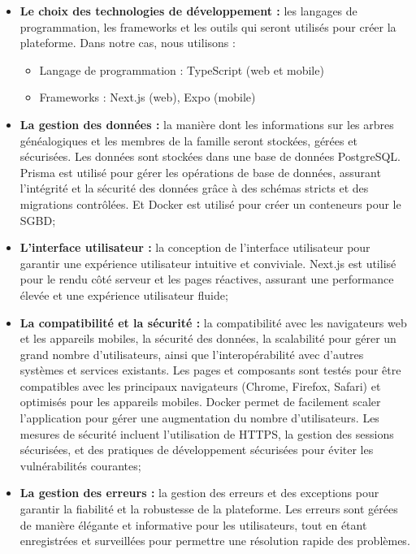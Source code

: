 \begin{itemize}
  \item \textbf{Le choix des technologies de développement :} les langages de
    programmation, les frameworks et les outils qui seront utilisés pour créer
    la plateforme. Dans notre cas, nous utilisons :
    \begin{itemize}
      \item Langage de programmation : TypeScript (web et mobile)
      \item Frameworks : Next.js (web), Expo (mobile)
    \end{itemize}

  \item \textbf{La gestion des données :} la manière dont les informations sur les
    arbres généalogiques et les membres de la famille seront stockées, gérées
    et sécurisées. Les données sont stockées dans une base de données
    PostgreSQL. Prisma est utilisé pour gérer les opérations de base de
    données, assurant l'intégrité et la sécurité des données grâce à des
    schémas stricts et des migrations contrôlées. Et Docker est utilisé pour
    créer un conteneurs pour le \ac{SGBD};

  \item \textbf{L’interface utilisateur :} la conception de l’interface utilisateur
    pour garantir une expérience utilisateur intuitive et conviviale.
    Next.js est utilisé pour le rendu côté serveur et les pages réactives,
    assurant une performance élevée et une expérience utilisateur fluide;

  \item \textbf{La compatibilité et la sécurité :} la compatibilité avec les navigateurs
    web et les appareils mobiles, la sécurité des données, la scalabilité pour
    gérer un grand nombre d’utilisateurs, ainsi que l’interopérabilité avec
    d’autres systèmes et services existants. Les pages et composants sont
    testés pour être compatibles avec les principaux navigateurs
    (Chrome, Firefox, Safari) et optimisés pour les appareils mobiles. Docker
    permet de facilement scaler l'application pour gérer une augmentation du
    nombre d'utilisateurs. Les mesures de sécurité incluent l'utilisation de
    HTTPS, la gestion des sessions sécurisées, et des pratiques de développement
    sécurisées pour éviter les vulnérabilités courantes;

  \item \textbf{La gestion des erreurs :} la gestion des erreurs et des exceptions
    pour garantir la fiabilité et la robustesse de la plateforme. Les erreurs
    sont gérées de manière élégante et informative pour les utilisateurs, tout
    en étant enregistrées et surveillées pour permettre une résolution rapide
    des problèmes.

\end{itemize}

